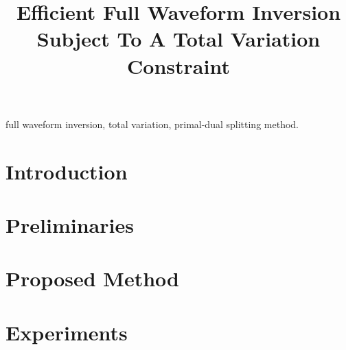 \documentclass[conference,a4paper]{IEEEtran}
\begin{document}
	

	\title{Efficient Full Waveform Inversion Subject To A Total Variation Constraint}


	\author{

		\and


		\and

	}


	\maketitle
	\begin{abstract}  \end{abstract}

	\begin{IEEEkeywords} full waveform inversion, total variation, primal-dual splitting method. \end{IEEEkeywords}

	\section{Introduction}      \label{sec:Introduction}    

	\section{Preliminaries}     \label{sec:Preliminaries}   

	\section{Proposed Method}   \label{sec:ProposedMethod}  

	\section{Experiments}       \label{sec:Experiments}     
\end{document}
